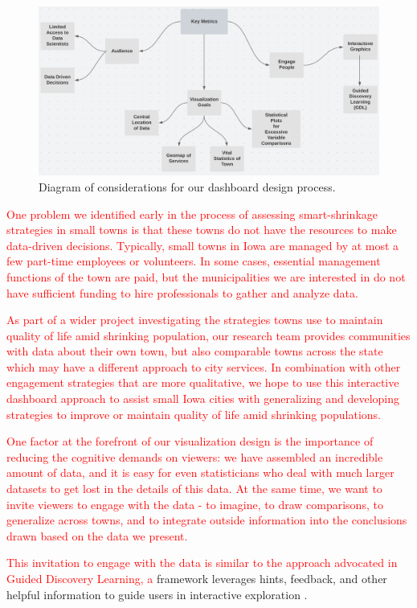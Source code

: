 \documentclass[letterpaper,inpress]{jdsart}
\begin{document}
\begin{figure}
\includegraphics[width=.5\textwidth]{Key_Metrics}
\caption{Diagram of considerations for our dashboard design process.}\label{fig:metrics}
\end{figure}

{\textcolor{red}{One problem we identified early in the process of assessing smart-shrinkage strategies in small towns is that these towns do not have the resources to make data-driven decisions. Typically, small towns in Iowa are managed by at most a few part-time employees or volunteers. In some cases, essential management functions of the town are paid, but the municipalities we are interested in do not have sufficient funding to hire professionals to gather and analyze data.}}

{\textcolor{red}{As part of a wider project investigating the strategies towns use to maintain quality of life amid shrinking population, our research team provides communities with data about their own town, but also comparable towns across the state which may have a different approach to city services. In combination with other engagement strategies that are more qualitative, we hope to use this interactive dashboard approach to assist small Iowa cities with generalizing and developing strategies to improve or maintain quality of life amid shrinking populations.}}

{\textcolor{red}{One factor at the forefront of our visualization design is the importance of reducing the cognitive demands on viewers: we have assembled an incredible amount of data, and it is easy for even statisticians who deal with much larger datasets to get lost in the details of this data. At the same time, we want to invite viewers to engage with the data - to imagine, to draw comparisons, to generalize across towns, and to integrate outside information into the conclusions drawn based on the data we present.}}

{\textcolor{red}{This invitation to engage with the data is similar to the approach advocated in Guided Discovery Learning, a}} framework leverages hints, feedback, and other helpful information to guide users in interactive exploration \citep{dedonno}.
\end{document}

